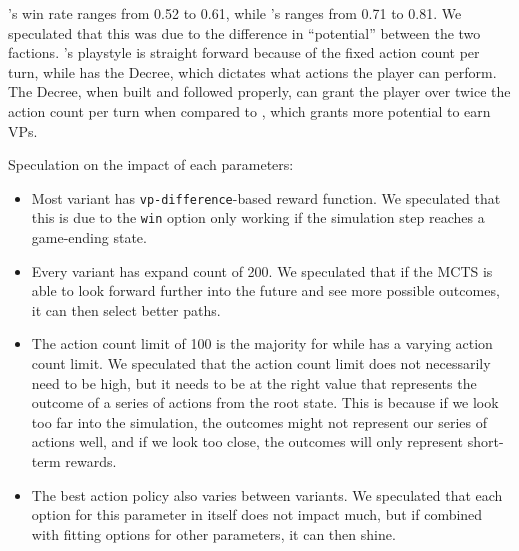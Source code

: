 
\Marquise{}'s win rate ranges from 0.52 to 0.61, while \Eyrie's ranges from 0.71 to 0.81. We speculated that this was due to the difference in ``potential'' between the two factions. \Marquise{}'s playstyle is straight forward because of the fixed action count per turn, while \Eyrie{} has the Decree, which dictates what actions the \Eyrie{} player can perform. The Decree, when built and followed properly, can grant the \Eyrie{} player over twice the action count per turn when compared to \Marquise{}, which grants more potential to earn VPs.

Speculation on the impact of each parameters:
\begin{itemize}
    \item Most variant has \texttt{vp-difference}-based reward function. We speculated that this is due to the \texttt{win} option only working if the simulation step reaches a game-ending state.
    \item Every variant has expand count of 200. We speculated that if the MCTS is able to look forward further into the future and see more possible outcomes, it can then select better paths.
    \item The action count limit of 100 is the majority for \Marquise{} while \Eyrie{} has a varying action count limit. We speculated that the action count limit does not necessarily need to be high, but it needs to be at the right value that represents the outcome of a series of actions from the root state. This is because if we look too far into the simulation, the outcomes might not represent our series of actions well, and if we look too close, the outcomes will only represent short-term rewards.
    \item The best action policy also varies between variants. We speculated that each option for this parameter in itself does not impact much, but if combined with fitting options for other parameters, it can then shine.
\end{itemize}

